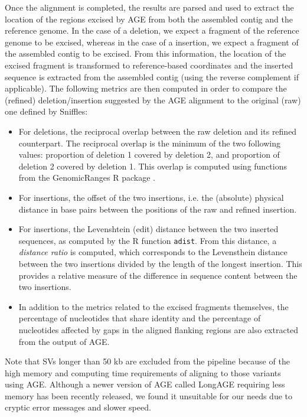 \documentclass[12pt]{article}
\begin{document}
Once the alignment is completed, the results are parsed and used to extract the location of the regions excised by AGE from both the assembled contig and the reference genome.
In the case of a deletion, we expect a fragment of the reference genome to be excised, whereas in the case of a insertion, we expect a fragment of the assembled contig to be excised.
From this information, the location of the excised fragment is transformed to reference-based coordinates and the inserted sequence is extracted from the assembled contig (using the reverse complement if applicable).
The following metrics are then computed in order to compare the (refined) deletion/insertion suggested by the AGE alignment to the original (raw) one defined by Sniffles:

\begin{itemize}
	\item For deletions, the reciprocal overlap between the raw deletion and its refined counterpart. The reciprocal overlap is the minimum of the two following values: proportion of deletion 1 covered by deletion 2, and proportion of deletion 2 covered by deletion 1. This overlap is computed using functions from the GenomicRanges R package \citep{granges}.
	\item For insertions, the offset of the two insertions, i.e. the (absolute) physical distance in base pairs between the positions of the raw and refined insertion.
	\item For insertions, the Levenshtein (edit) distance between the two inserted sequences, as computed by the R function \texttt{adist}. From this distance, a {\em distance ratio} is computed, which corresponds to the Levensthein distance between the two insertions divided by the length of the longest insertion. This provides a relative measure of the difference in sequence content between the two insertions.
	\item In addition to the metrics related to the excised fragments themselves, the percentage of nucleotides that share identity and the percentage of nucleotides affected by gaps in the aligned flanking regions are also extracted from the output of AGE.
\end{itemize}


Note that SVs longer than 50 kb are excluded from the pipeline because of the high memory and computing time requirements of aligning to those variants using AGE.
Although a newer version of AGE called LongAGE \citep{longage} requiring less memory has been recently released, we found it unsuitable for our needs due to cryptic error messages and slower speed.
\end{document}
